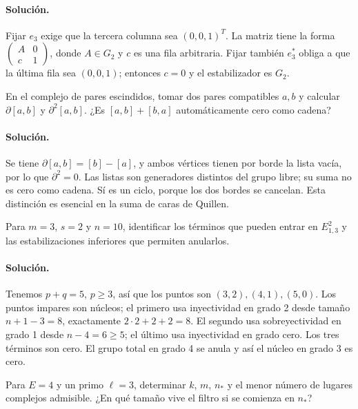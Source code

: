 \paragraph{Solución.} Fijar $e_3$ exige que la tercera columna sea $(0,0,1)^T$. La matriz tiene la forma $\left(\begin{smallmatrix}A&0\\ c&1\end{smallmatrix}\right)$, donde $A\in G_2$ y $c$ es una fila arbitraria. Fijar también $e_3^*$ obliga a que la última fila sea $(0,0,1)$; entonces $c=0$ y el estabilizador es $G_2$.

\begin{ejercicio}
En el complejo de pares escindidos, tomar dos pares compatibles $a,b$ y calcular $\partial[a,b]$ y $\partial^2[a,b]$. ¿Es $[a,b]+[b,a]$ automáticamente cero como cadena?
\end{ejercicio}
\paragraph{Solución.} Se tiene $\partial[a,b]=[b]-[a]$, y ambos vértices tienen por borde la lista vacía, por lo que $\partial^2=0$. Las listas son generadores distintos del grupo libre; su suma no es cero como cadena. Sí es un ciclo, porque los dos bordes se cancelan. Esta distinción es esencial en la suma de caras de Quillen.

\clearpage
\begin{ejercicio}
Para $m=3$, $s=2$ y $n=10$, identificar los términos que pueden entrar en $E^2_{1,3}$ y las estabilizaciones inferiores que permiten anularlos.
\end{ejercicio}
\paragraph{Solución.} Tenemos $p+q=5$, $p\ge3$, así que los puntos son $(3,2),(4,1),(5,0)$. Los puntos impares son núcleos; el primero usa inyectividad en grado 2 desde tamaño $n+1-3=8$, exactamente $2\cdot2+2+2=8$. El segundo usa sobreyectividad en grado 1 desde $n-4=6\ge5$; el último usa inyectividad en grado cero. Los tres términos son cero. El grupo total en grado 4 se anula y así el núcleo en grado 3 es cero.

\begin{ejercicio}
Para $E=4$ y un primo $\ell=3$, determinar $k$, $m$, $n_*$ y el menor número de lugares complejos admisible. ¿En qué tamaño vive el filtro si se comienza en $n_*$?
\end{ejercicio}
